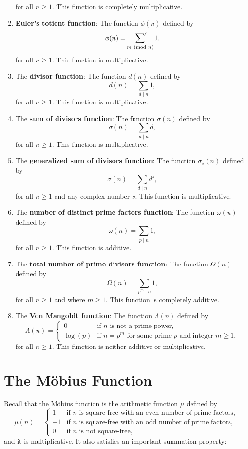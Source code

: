 \documentclass[12pt]{book}
\theoremstyle{definition}\newframedtheorem{method}{Method}
\newcommand{\psum}{\sideset{}{'}\sum}
\newcommand{\tmod}[1]{\ \left(\text{mod }#1\right)}
\newcommand{\s}{\sigma}
\newcommand{\w}{\omega}
\renewcommand{\L}{\Lambda}
\newcommand{\W}{\Omega}
\newcommand{\<}{\langle}
\renewcommand{\>}{\rangle}
\begin{document}
\begin{enumerate}[label=(\roman*)]
\[      \]
      for all $n \ge 1$. This function is completely multiplicative.
      \item \textbf{Euler's totient function}: The function $\phi(n)$ defined by
      \[
        \phi(n) = \psum_{m \tmod{n}}1,
      \]
      for all $n \ge 1$. This function is multiplicative.
      \item The \textbf{divisor function}: The function $d(n)$ defined by
      \[
        d(n) = \sum_{d \mid n}1,
      \]
      for all $n \ge 1$. This function is multiplicative.
      \item The \textbf{sum of divisors function}: The function $\s(n)$ defined by
      \[
        \s(n) = \sum_{d \mid n}d,
      \]
      for all $n \ge 1$. This function is multiplicative.
      \item The \textbf{generalized sum of divisors function}: The function $\s_{s}(n)$ defined by
      \[
        \s(n) = \sum_{d \mid n}d^{s},
      \]
      for all $n \ge 1$ and any complex number $s$. This function is multiplicative.
      \item The \textbf{number of distinct prime factors function}: The function $\w(n)$ defined by
      \[
        \w(n) = \sum_{p \mid n}1,
      \]
      for all $n \ge 1$. This function is additive.
      \item The \textbf{total number of prime divisors function}: The function $\W(n)$ defined by
      \[
        \W(n) = \sum_{p ^{m} \mid n}1,
      \]
      for all $n \ge 1$ and where $m \ge 1$. This function is completely additive.
      \item The \textbf{Von Mangoldt function}: The function $\L(n)$ defined by
      \[
        \L(n) = \begin{cases} 0 & \text{if $n$ is not a prime power}, \\ \log(p) & \text{if $n = p^{m}$ for some prime $p$ and integer $m \ge 1$}, \end{cases}
      \]
      for all $n \ge 1$. This function is neither additive or multiplicative.
    \end{enumerate}
  \section{The M\"obius Function}\label{append:The_Mobius_Function}
    Recall that the M\"obius function is the arithmetic function $\mu$ defined by
    \[
      \mu(n) = \begin{cases} 1 & \text{if $n$ is square-free with an even number of prime factors}, \\ -1 & \text{if $n$ is square-free with an odd number of prime factors}, \\ 0 & \text{if $n$ is not square-free}, \end{cases}
    \]
    and it is multiplicative. It also satisfies an important summation property:
\end{document}
